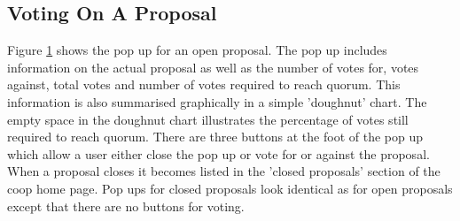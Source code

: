 \subsection{Voting On A Proposal}
\begin{figure}
\centering
{}
\decoRule
\caption[]{}
\label{fig:proposalvote}
\end{figure}

Figure \ref{fig:proposalvote} shows the pop up for an open proposal. The pop up includes information on the actual proposal as well as the number of votes for, votes against, total votes and number of votes required to reach quorum. This information is also summarised graphically in a simple 'doughnut' chart. The empty space in the doughnut chart illustrates the percentage of votes still required to reach quorum. There are three buttons at the foot of the pop up which allow a user either close the pop up or vote for or against the proposal.\\

When a proposal closes it becomes listed in the 'closed proposals' section of the coop home page. Pop ups for closed proposals look identical as for open proposals except that there are no buttons for voting.\\


